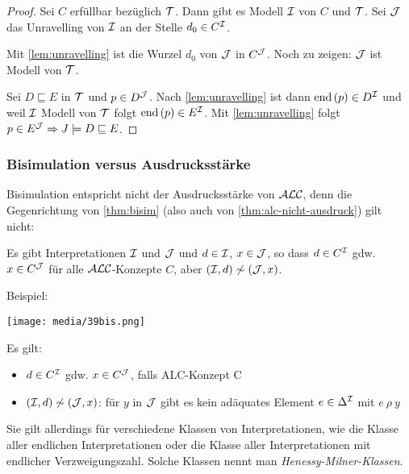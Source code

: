 \begin{tafel}
\begin{proof}
Sei $C$ erfüllbar bezüglich $\mathcal{T}$. Dann gibt es Modell $\mathcal{I}$ von $C$ und $\mathcal{T}$. Sei $\mathcal{J}$ das Unravelling von $\mathcal{I}$ an der Stelle
$d_0 \in C^{\mathcal{I}}$.

Mit \autoref{lem:unravelling} ist die Wurzel $d_0$ von $\mathcal{J}$ in $C^{\mathcal{J}}$. Noch zu zeigen: $\mathcal{J}$ ist Modell von $\mathcal{T}$. 

Sei $D \sqsubseteq E$ in $\mathcal{T}$ und $p \in D^{\mathcal{J}}$. Nach
\autoref{lem:unravelling} ist dann $\text{end}\left( p \right) \in D^{\mathcal{I}}$
und weil $\mathcal{I}$ Modell von $\mathcal{T}$ folgt $\text{end}\left( p \right) \in
E^{\mathcal{I}}$. Mit \autoref{lem:unravelling} folgt $p \in E^{\mathcal{J}}
\Rightarrow J \models D \sqsubseteq E$. %
\end{proof}
\end{tafel}

\subsubsection{Bisimulation versus Ausdrucksstärke}\label{bisimulation-versus-ausdrucksstuxe4rke}

Bisimulation entspricht nicht der Ausdrucksstärke von $\mathcal{A}\mathcal{L}\mathcal{C}$, denn die Gegenrichtung von \autoref{thm:bisim} (also auch von \autoref{thm:alc-nicht-ausdruck}) gilt nicht:

Es gibt Interpretationen $\mathcal{I}$ und $\mathcal{J}$ und $d \in \mathcal{I}$, $x \in \mathcal{J}$, so dass $d \in C^{\mathcal{I}}$ gdw. $x \in C^{\mathcal{J}}$ für alle $\mathcal{A}\mathcal{L}\mathcal{C}$-Konzepte $C$, aber $(\mathcal{I},d) \not\sim (\mathcal{J},x)$. 

\begin{tafel}
Beispiel:

\texttt{[image: media/39bis.png]}

Es gilt:

\begin{itemize}
  \item $d \in C^{\mathcal{I}}$ gdw. $x \in C^{\mathcal{J}}$, falls ALC-Konzept C
  \item $(\mathcal{I},d) \not\sim (\mathcal{J},x)$: für $y$ in $\mathcal{J}$ gibt es kein adäquates Element $e \in \Delta^{\mathcal{I}}$ mit $e\ \rho\ y$
\end{itemize}
\end{tafel}

Sie gilt allerdings für verschiedene Klassen von Interpretationen, wie die Klasse aller endlichen Interpretationen oder die Klasse aller Interpretationen mit endlicher Verzweigungszahl. Solche Klassen nennt man \emph{Henessy-Milner-Klassen}.

